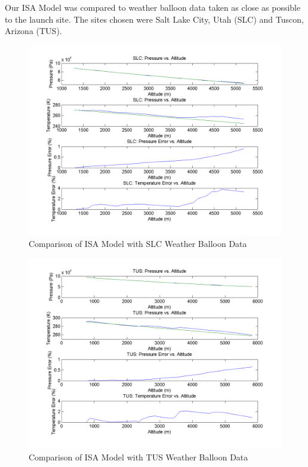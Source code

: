\documentclass[]{book}
\begin{document}
Our ISA Model was compared to weather balloon data taken as close as
possible to the launch site. The sites chosen were Salt Lake City, Utah
(SLC) and Tuscon, Arizona (TUS).

\begin{figure}[htbp]
\centering
\includegraphics{images/plots/SLC_plot.png}
\caption{Comparison of ISA Model with SLC Weather Balloon Data
\label{atmosphere1_plot_label}}
\end{figure}

\begin{figure}[htbp]
\centering
\includegraphics{images/plots/TUS_plot.png}
\caption{Comparison of ISA Model with TUS Weather Balloon Data
\label{atmosphere2_plot_label}}
\end{figure}
\end{document}

